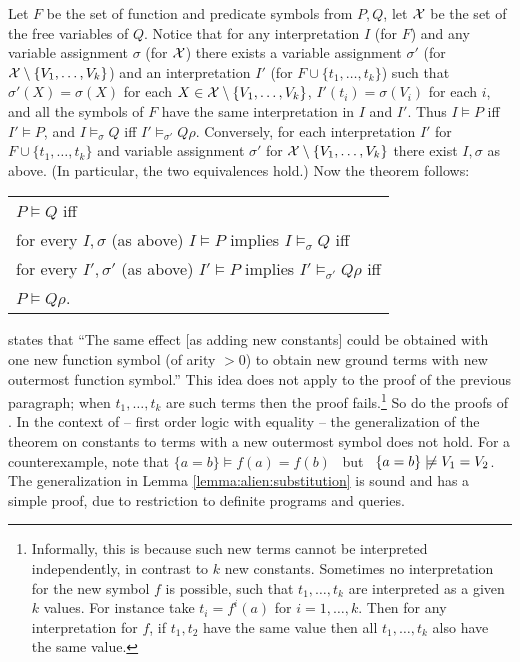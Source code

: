\documentclass[a4paper]{tlp2}
\newcommand*{\seq}[2][n]  {{#2_{1}, \allowbreak \ldots, \allowbreak #2_{#1}}}
\newcommand*{\notmodels}{\mathrel{\,\not\!\models}}
\newcommand*{\X}{{\ensuremath{\cal X}}\xspace}
\begin{document}
Let $F$ be the set of function and predicate symbols from $P,Q$, let 
\X be the set of the free variables of $Q$.
Notice that
for any interpretation $I$ (for $F$) and any variable assignment $\sigma$
(for \X)
there exists a variable assignment $\sigma'$
(for $\X\setminus\{\seq[k]V\}$)
and an interpretation $I'$ 
(for $F\cup\{\seq[k]t\}$) such that
$\sigma'(X)=\sigma(X)$ for each $X\in\X\setminus\{\seq[k]V\}$,
 $I'(t_i)=\sigma(V_i)$ for each $i$, and all the symbols
of $F$ have the same interpretation in $I$ and $I'$.  
Thus $I\models P$ iff $I'\models P$, and 
$I\models_\sigma Q$ iff $I'\models_{\sigma'} Q\rho$.
Conversely, for each interpretation $I'$ for $F\cup\{\seq[k]t\}$
and variable assignment $\sigma'$ for $\X\setminus\{\seq[k]V\}$
there exist $I,\sigma$ as above. (In particular, the two equivalences hold.)
Now the theorem follows:
\smallskip

\begin{tabular}{l}
$P\models Q$ iff  \\
for every $I,\sigma$ (as above) $I\models P$ implies $I\models_{\sigma}Q$
iff \\
for every $I',\sigma'$ (as above) $I'\models P$ implies
$I'\models_{\sigma'}Q\rho$ iff \\
$P\models Q\rho$.
\end{tabular}
\smallskip




states that ``The same effect 
[as adding new constants] could be obtained with one new function symbol (of
arity $>0$) to obtain new ground terms with new outermost function symbol.''
This idea does not apply to the proof of the previous paragraph;
when $\seq[k]t$ are such terms then the proof fails.\footnote{Informally, this is because such new terms cannot be interpreted
  independently, in contrast to $k$ new constants.
Sometimes no interpretation for the new symbol $f$ is possible,
  such that  $\seq[k]t$ are interpreted as a given $k$ values.
  For instance take $t_i=f^i(a)$ for $i=1,\ldots,k$.
  Then for any interpretation for $f$,
  if $t_1,t_2$ have the same value then all $\seq[k]t$ also have the same value.
} So do the proofs of  \cite{shoenfield67,HandbookLAILP:FOL}.
In the context of \cite{shoenfield67} -- first order logic with equality -- the
generalization of the theorem on constants to terms with a
new outermost symbol does not hold.
For a counterexample, note that 
$\{a=b\}\models f(a)=f(b)$ \ but \ 
$\{a=b\}\notmodels V_1=V_2$.
The generalization in Lemma \ref{lemma:alien:substitution} is
sound and has a simple proof, due to restriction to 
definite programs and queries.
\end{document}
